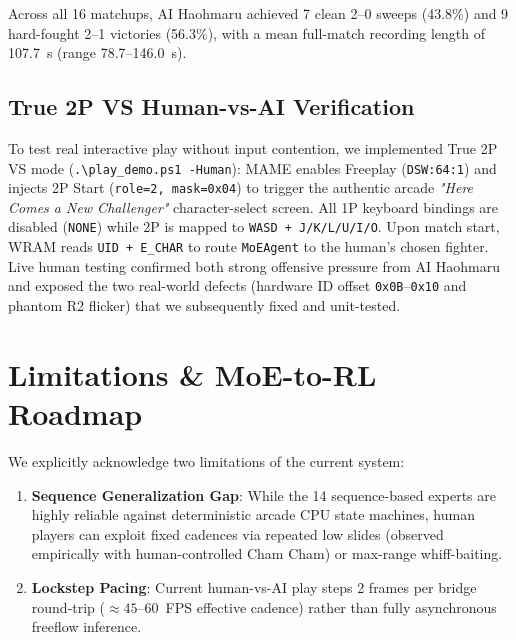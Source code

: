 \documentclass[10pt,twocolumn]{article}
\begin{document}
Across all 16 matchups, AI Haohmaru achieved 7 clean 2--0 sweeps (43.8\%) and 9 hard-fought 2--1 victories (56.3\%), with a mean full-match recording length of 107.7~s (range 78.7--146.0~s).

\subsection{True 2P VS Human-vs-AI Verification}
To test real interactive play without input contention, we implemented True 2P VS mode (\texttt{.\textbackslash play\_demo.ps1 -Human}): MAME enables Freeplay (\texttt{DSW:64:1}) and injects 2P Start (\texttt{role=2, mask=0x04}) to trigger the authentic arcade \emph{"Here Comes a New Challenger"} character-select screen. All 1P keyboard bindings are disabled (\texttt{NONE}) while 2P is mapped to \texttt{WASD + J/K/L/U/I/O}. Upon match start, WRAM reads \texttt{UID + E\_CHAR} to route \texttt{MoEAgent} to the human's chosen fighter. Live human testing confirmed both strong offensive pressure from AI Haohmaru and exposed the two real-world defects (hardware ID offset \texttt{0x0B}--\texttt{0x10} and phantom R2 flicker) that we subsequently fixed and unit-tested.

\section{Limitations \& MoE-to-RL Roadmap}
We explicitly acknowledge two limitations of the current system:
\begin{enumerate}
    \item \textbf{Sequence Generalization Gap}: While the 14 sequence-based experts are highly reliable against deterministic arcade CPU state machines, human players can exploit fixed cadences via repeated low slides (observed empirically with human-controlled Cham Cham) or max-range whiff-baiting.
    \item \textbf{Lockstep Pacing}: Current human-vs-AI play steps 2 frames per bridge round-trip ($\approx 45$--60~FPS effective cadence) rather than fully asynchronous freeflow inference.
\end{enumerate}
\end{document}
